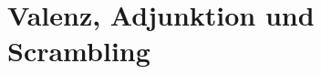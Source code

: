 \documentclass{scrarticle}
\begin{document}

\section{Valenz, Adjunktion und Scrambling}
\end{document}
